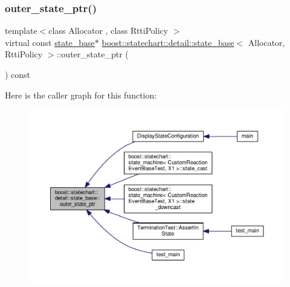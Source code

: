 \subsubsection{\texorpdfstring{outer\+\_\+state\+\_\+ptr()}{outer\_state\_ptr()}}
{\footnotesize\ttfamily template$<$class Allocator , class Rtti\+Policy $>$ \\
virtual const \mbox{\hyperlink{classboost_1_1statechart_1_1detail_1_1state__base}{state\+\_\+base}}$\ast$ \mbox{\hyperlink{classboost_1_1statechart_1_1detail_1_1state__base}{boost\+::statechart\+::detail\+::state\+\_\+base}}$<$ Allocator, Rtti\+Policy $>$\+::outer\+\_\+state\+\_\+ptr (\begin{DoxyParamCaption}{ }\end{DoxyParamCaption}) const\hspace{0.3cm}{\ttfamily [pure virtual]}}

Here is the caller graph for this function\+:
\nopagebreak
\begin{figure}[H]
\begin{center}
\leavevmode
\includegraphics[width=350pt]{classboost_1_1statechart_1_1detail_1_1state__base_a03d51c261c052af1db3bb08b31891731_icgraph}
\end{center}
\end{figure}
\mbox{\label{classboost_1_1statechart_1_1detail_1_1state__base_a2aaeac79511df5c28dc43250c83d6881}} 
